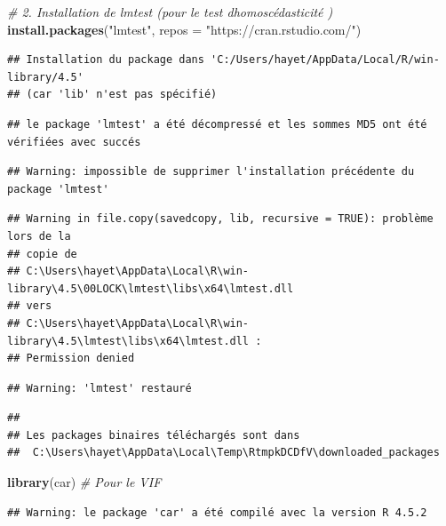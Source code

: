 \documentclass[
]{article}
\newenvironment{Shaded}{\begin{snugshade}}{\end{snugshade}}
\newcommand{\AttributeTok}[1]{\textcolor[rgb]{0.13,0.29,0.53}{#1}}
\newcommand{\CommentTok}[1]{\textcolor[rgb]{0.56,0.35,0.01}{\textit{#1}}}
\newcommand{\FunctionTok}[1]{\textcolor[rgb]{0.13,0.29,0.53}{\textbf{#1}}}
\newcommand{\NormalTok}[1]{#1}
\newcommand{\StringTok}[1]{\textcolor[rgb]{0.31,0.60,0.02}{#1}}
\begin{document}
\begin{Shaded}
\begin{Highlighting}[]
\CommentTok{\# 2. Installation de lmtest (pour le test d\textquotesingle{}homoscédasticité )}
\FunctionTok{install.packages}\NormalTok{(}\StringTok{"lmtest"}\NormalTok{, }\AttributeTok{repos =} \StringTok{"https://cran.rstudio.com/"}\NormalTok{)}
\end{Highlighting}
\end{Shaded}

\begin{verbatim}
## Installation du package dans 'C:/Users/hayet/AppData/Local/R/win-library/4.5'
## (car 'lib' n'est pas spécifié)
\end{verbatim}

\begin{verbatim}
## le package 'lmtest' a été décompressé et les sommes MD5 ont été vérifiées avec succés
\end{verbatim}

\begin{verbatim}
## Warning: impossible de supprimer l'installation précédente du package 'lmtest'
\end{verbatim}

\begin{verbatim}
## Warning in file.copy(savedcopy, lib, recursive = TRUE): problème lors de la
## copie de
## C:\Users\hayet\AppData\Local\R\win-library\4.5\00LOCK\lmtest\libs\x64\lmtest.dll
## vers
## C:\Users\hayet\AppData\Local\R\win-library\4.5\lmtest\libs\x64\lmtest.dll :
## Permission denied
\end{verbatim}

\begin{verbatim}
## Warning: 'lmtest' restauré
\end{verbatim}

\begin{verbatim}
## 
## Les packages binaires téléchargés sont dans
##  C:\Users\hayet\AppData\Local\Temp\RtmpkDCDfV\downloaded_packages
\end{verbatim}

\begin{Shaded}
\begin{Highlighting}[]
\FunctionTok{library}\NormalTok{(car)    }\CommentTok{\# Pour le VIF}
\end{Highlighting}
\end{Shaded}

\begin{verbatim}
## Warning: le package 'car' a été compilé avec la version R 4.5.2
\end{verbatim}
\end{document}
